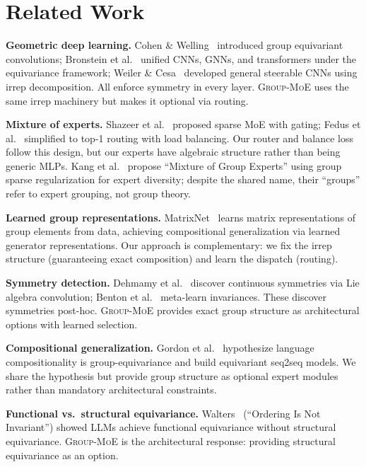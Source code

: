 \documentclass[10pt, letterpaper]{article}
\newcommand{\gmoe}{\textsc{Group-MoE}}
\begin{document}
\section{Related Work}
\label{sec:related}

\textbf{Geometric deep learning.} Cohen \& Welling~\cite{cohen2016group} introduced group equivariant convolutions; Bronstein et al.~\cite{bronstein2021geometric} unified CNNs, GNNs, and transformers under the equivariance framework; Weiler \& Cesa~\cite{weiler2019general} developed general steerable CNNs using irrep decomposition. All enforce symmetry in every layer. \gmoe{} uses the same irrep machinery but makes it optional via routing.

\textbf{Mixture of experts.} Shazeer et al.~\cite{shazeer2017outrageously} proposed sparse MoE with gating; Fedus et al.~\cite{fedus2022switch} simplified to top-1 routing with load balancing. Our router and balance loss follow this design, but our experts have algebraic structure rather than being generic MLPs. Kang et al.~\cite{kang2025mixture} propose ``Mixture of Group Experts'' using group sparse regularization for expert diversity; despite the shared name, their ``groups'' refer to expert grouping, not group theory.

\textbf{Learned group representations.} MatrixNet~\cite{laird2024matrixnet} learns matrix representations of group elements from data, achieving compositional generalization via learned generator representations. Our approach is complementary: we fix the irrep structure (guaranteeing exact composition) and learn the dispatch (routing).

\textbf{Symmetry detection.} Dehmamy et al.~\cite{dehmamy2021automatic} discover continuous symmetries via Lie algebra convolution; Benton et al.~\cite{benton2020learning} meta-learn invariances. These discover symmetries post-hoc. \gmoe{} provides exact group structure as architectural options with learned selection.

\textbf{Compositional generalization.} Gordon et al.~\cite{gordon2020permutation} hypothesize language compositionality is group-equivariance and build equivariant seq2seq models. We share the hypothesis but provide group structure as optional expert modules rather than mandatory architectural constraints.

\textbf{Functional vs.\ structural equivariance.} Walters~\cite{walters2025ordering} (``Ordering Is Not Invariant'') showed LLMs achieve functional equivariance without structural equivariance. \gmoe{} is the architectural response: providing structural equivariance as an option.
\end{document}
